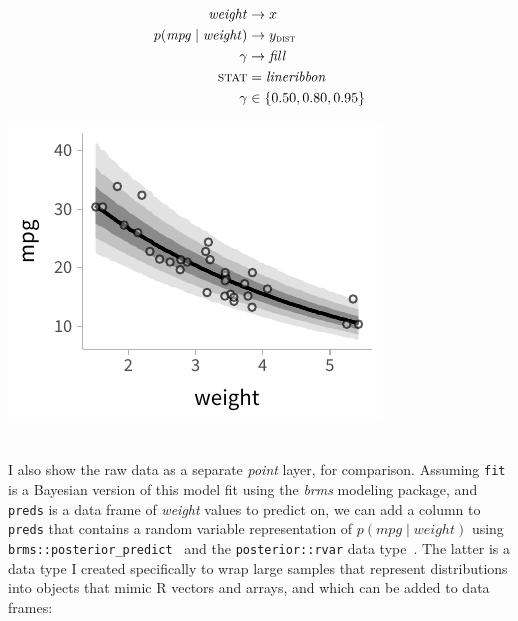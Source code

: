 \documentclass[journal]{vgtc}                     %
\newcommand{\equationfigure}[2]{%
\noindent
\begin{minipage}{.5\columnwidth}
\setlength{\abovedisplayskip}{0pt}
\setlength{\belowdisplayskip}{0pt}
#1\end{minipage}%
\begin{minipage}{.4\columnwidth}\centering #2 \end{minipage}%
\vspace{.5\belowdisplayskip}\\
}
\begin{document}
\equationfigure{
\begin{align*}
\mathit{weight} &\rightarrow x\\
p(\mathit{mpg} \mid \mathit{weight}) &\rightarrow y_\textsc{dist}\\
\gamma &\rightarrow \mathit{fill}\\
\textsc{stat} &= \mathit{lineribbon}\\
\gamma &\in \{0.50, 0.80, 0.95\}
\end{align*}
}{\includegraphics[width=1.2\columnwidth]{figs/3-lineribbon.pdf}}
I also show the raw data as a separate \textit{point} layer, for comparison. Assuming \texttt{fit}  is a Bayesian version of this model fit using the \textit{brms} modeling package, and \texttt{preds} is a data frame of \textit{weight} values to predict on, we can add a column to \texttt{preds} that contains a random variable representation of $p(\mathit{mpg} \mid \mathit{weight})$ using \texttt{brms::posterior\_predict}~\cite{burkner2017brms} and the \texttt{posterior::rvar}  data type~\cite{burkner2022posterior}. The latter is a data type I created specifically to wrap large samples that represent distributions into objects that mimic R vectors and arrays,
and which can be added to data frames:
\end{document}
